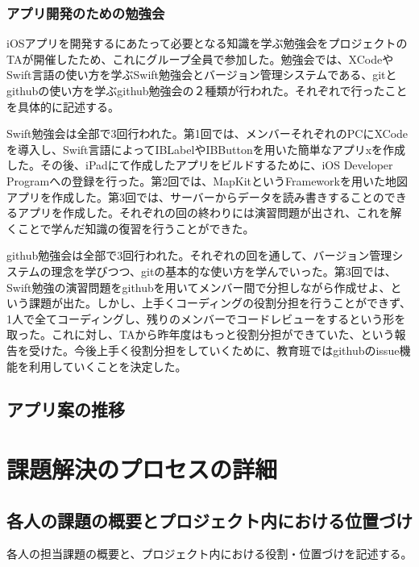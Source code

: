 \documentclass[openany,11pt,papersize]{jsbook}
\begin{document}
\subsection{アプリ開発のための勉強会}
\par iOSアプリを開発するにあたって必要となる知識を学ぶ勉強会をプロジェクトのTAが開催したため、これにグループ全員で参加した。勉強会では、XCodeやSwift言語の使い方を学ぶSwift勉強会とバージョン管理システムである、gitとgithubの使い方を学ぶgithub勉強会の２種類が行われた。それぞれで行ったことを具体的に記述する。
\par Swift勉強会は全部で3回行われた。第1回では、メンバーそれぞれのPCにXCodeを導入し、Swift言語によってIBLabelやIBButtonを用いた簡単なアプリxを作成した。その後、iPadにて作成したアプリをビルドするために、iOS Developer Programへの登録を行った。第2回では、MapKitというFrameworkを用いた地図アプリを作成した。第3回では、サーバーからデータを読み書きすることのできるアプリを作成した。それぞれの回の終わりには演習問題が出され、これを解くことで学んだ知識の復習を行うことができた。
\par github勉強会は全部で3回行われた。それぞれの回を通して、バージョン管理システムの理念を学びつつ、gitの基本的な使い方を学んでいった。第3回では、Swift勉強の演習問題をgithubを用いてメンバー間で分担しながら作成せよ、という課題が出た。しかし、上手くコーディングの役割分担を行うことができず、1人で全てコーディングし、残りのメンバーでコードレビューをするという形を取った。これに対し、TAから昨年度はもっと役割分担ができていた、という報告を受けた。今後上手く役割分担をしていくために、教育班ではgithubのissue機能を利用していくことを決定した。

\section{アプリ案の推移}






\chapter{課題解決のプロセスの詳細}

\section{各人の課題の概要とプロジェクト内における位置づけ}
\begin{hissu}
各人の担当課題の概要と、プロジェクト内における役割・位置づけを記述する。
\end{hissu}
\end{document}
